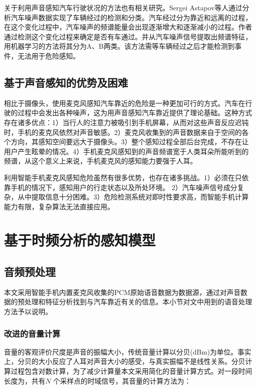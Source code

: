 关于利用声音感知汽车行驶状况的方法也有相关研究。Sergei Astapov等人通过分析汽车噪声数据实现了车辆经过的检测和分类。汽车经过分为靠近和远离的过程，在这个变化过程中，汽车噪声的频谱能量会出现逐渐增大和逐渐减小的过程。作者通过检测这个变化过程来确定是否有车通过。并从汽车噪声信号提取出频谱特征，用机器学习的方法将其分为A、B两类。该方法需等车辆经过之后才能检测到事件，无法用于危险感知。


\subsection{基于声音感知的优势及困难}

相比于摄像头，使用麦克风感知汽车靠近的危险是一种更加可行的方式。汽车在行驶的过程中会发出各种噪声，这为用声音感知汽车靠近提供了理论基础。这种方式存在诸多优点：1）当行人的注意力被吸引到手机屏幕，从而对这些声音反应迟钝时，手机的麦克风依然对声音敏感。2）麦克风收集到的声音数据来自于空间的各个方向，其感知空间要远大于摄像头。3）整个感知过程全部后台完成，不存在让用户产生眩晕的情况。4）手机麦克风感知到的声音频谱宽于人类耳朵所能听到的频谱，从这个意义上来说，手机麦克风的感知能力要强于人耳。


利用智能手机麦克风感知危险虽然有很多优势，也存在诸多挑战。1）必须在只依靠手机的情况下，感知用户的行走状态以及所处环境。 2）汽车噪声信号成分复杂，从中提取信息十分困难。3）危险检测系统对即时性要求高，而智能手机计算能力有限，复杂算法无法直接应用。



\section{基于时频分析的感知模型}

\subsection{音频预处理}
本文采用智能手机内置麦克风收集的PCM原始语音数据为数据源，通过对声音数据的预处理和特征分析找到与汽车靠近有关的信息。本小节对文中用到的语音处理方法予以说明。

\subsubsection{改进的音量计算}
音量的客观评价尺度是声音的振幅大小，传统音量计算以分贝(dBm)为单位。事实上，分贝的大小反应了人耳对声音大小的感受，与真实振幅不是线性关系。分贝计算过程包含对数计算，为了减少计算量本文采用简化的音量计算方式。对一段时间长度为，共有$N$ 个采样点的时域信号，其音量的计算方法为：

